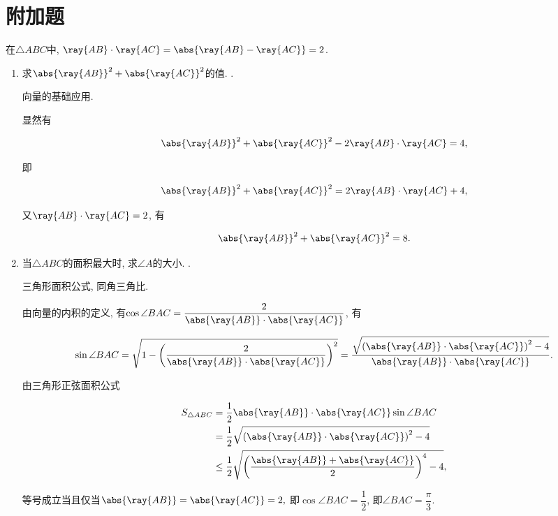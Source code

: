 \documentclass[8pt]{article}
\begin{document}
	\section{附加题}
		 在\(\triangle ABC\)中, \(\ray{AB} \cdot \ray{AC} = \abs{\ray{AB} - \ray{AC}} = 2\).
			\begin{enumerate}[label=\calword{(\arabic*)}]
				\item 求\(\abs{\ray{AB}}^2 + \abs{\ray{AC}}^2\)的值. .
    
					 向量的基础应用.

                    显然有

                    \[\abs{\ray{AB}}^2 + \abs{\ray{AC}}^2 - 2\ray{AB}\cdot\ray{AC} = 4,\]

                    即

                    \[\abs{\ray{AB}}^2 + \abs{\ray{AC}}^2 = 2 \ray{AB} \cdot \ray{AC} + 4,\]

                    又\(\ray{AB} \cdot \ray{AC} = 2\), 有

                    \[\abs{\ray{AB}}^2 + \abs{\ray{AC}}^2 = 8.\]

				\item 当\(\triangle ABC\)的面积最大时, 求\(\angle A\)的大小. .
    
					 三角形面积公式, 同角三角比.

                    由向量的内积的定义, 有\(\cos \angle BAC = \dfrac{2}{\abs{\ray{AB}} \cdot \abs{\ray{AC}}}\), 有
                    
                    \[\sin \angle BAC = \sqrt{1 - \left(\frac{2}{\abs{\ray{AB}}\cdot\abs{\ray{AC}}}\right)^2}=\frac{\sqrt{\left(\abs{\ray{AB}}\cdot\abs{\ray{AC}}\right)^2 - 4}}{\abs{\ray{AB}} \cdot \abs{\ray{AC}}}.\]

                    由三角形正弦面积公式

                    \begin{align*}
                        S_{\triangle ABC}   &= \frac{1}{2} \abs{\ray{AB}} \cdot \abs{\ray{AC}} \sin \angle BAC\\
                                            &= \frac{1}{2} \sqrt{\left(\abs{\ray{AB}} \cdot \abs{\ray{AC}}\right)^2 - 4}\\
                                            &\leq \frac{1}{2} \sqrt{\left(\frac{\abs{\ray{AB}} + \abs{\ray{AC}}}{2}\right)^4 - 4},
                    \end{align*}

                    等号成立当且仅当\(\abs{\ray{AB}} = \abs{\ray{AC}} = 2,\) 即\(\cos \angle BAC = \dfrac{1}{2}\), 即\(\angle BAC = \dfrac{\pi}{3}\).

			\end{enumerate}
\end{document}

